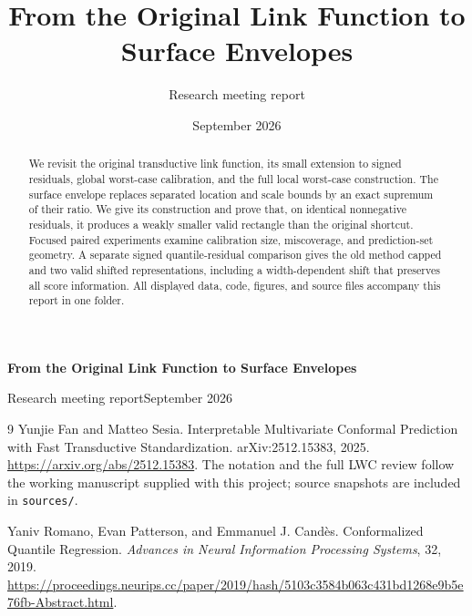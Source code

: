 \documentclass[11pt]{article}
\title{From the Original Link Function to Surface Envelopes}
\author{Research meeting report}
\date{September 2026}
\begin{document}
\begin{center}
{\Large\bfseries From the Original Link Function to Surface Envelopes\par}
\vspace{0.7em}
Research meeting report\qquad September 2026
\end{center}
\vspace{0.4em}
\begin{abstract}
We revisit the original transductive link function, its small extension to
signed residuals, global worst-case calibration, and the full local worst-case
construction. The surface envelope replaces separated location and scale
bounds by an exact supremum of their ratio. We give its construction and prove
that, on identical nonnegative residuals, it produces a weakly smaller valid
rectangle than the original shortcut. Focused paired experiments examine
calibration size, miscoverage, and prediction-set geometry. A separate signed
quantile-residual comparison gives the old method capped and two valid shifted
representations, including a width-dependent shift that preserves all score
information. All displayed data, code, figures, and source files accompany
this report in one folder.
\end{abstract}




\FloatBarrier
\begin{thebibliography}{9}
 Yunjie Fan and Matteo Sesia.
Interpretable Multivariate Conformal Prediction with Fast Transductive
Standardization. arXiv:2512.15383, 2025.
\url{https://arxiv.org/abs/2512.15383}.
The notation and the full LWC review follow the working manuscript supplied
with this project; source snapshots are included in \texttt{sources/}.

 Yaniv Romano, Evan Patterson, and Emmanuel J. Cand\`es.
Conformalized Quantile Regression. \emph{Advances in Neural Information
Processing Systems}, 32, 2019.
\url{https://proceedings.neurips.cc/paper/2019/hash/5103c3584b063c431bd1268e9b5e76fb-Abstract.html}.
\end{thebibliography}
\end{document}
